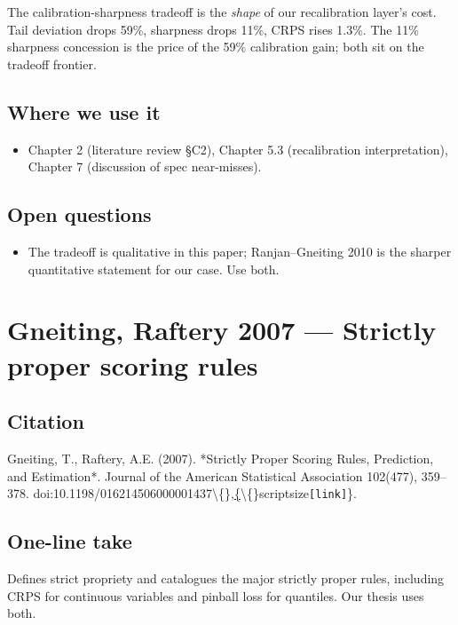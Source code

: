 \documentclass[11pt,a4paper,openany]{report}
\begin{document}
The calibration-sharpness tradeoff is the \emph{shape} of our recalibration
layer's cost. Tail deviation drops 59\%, sharpness drops 11\%, CRPS rises
1.3\%. The 11\% sharpness concession is the price of the 59\%
calibration gain; both sit on the tradeoff frontier.

\section{Where we use it}

\begin{itemize}
  \item Chapter 2 (literature review §C2), Chapter 5.3 (recalibration
    interpretation), Chapter 7 (discussion of spec near-misses).
\end{itemize}

\section{Open questions}

\begin{itemize}
  \item The tradeoff is qualitative in this paper; Ranjan–Gneiting 2010 is
    the sharper quantitative statement for our case. Use both.
\end{itemize}

\chapter{Gneiting, Raftery 2007 — Strictly proper scoring rules}

\section{Citation}

Gneiting, T., Raftery, A.E. (2007). *Strictly Proper Scoring Rules,
Prediction, and Estimation*. Journal of the American Statistical
Association 102(477), 359–378.
doi:10.1198/016214506000001437\textbackslash\{\},\href{https://doi.org/10.1198/016214506000001437}\{\textbackslash\{\}scriptsize\texttt{[link]}\}.

\section{One-line take}

Defines strict propriety and catalogues the major strictly proper
rules, including CRPS for continuous variables and pinball loss for
quantiles. Our thesis uses both.
\end{document}
